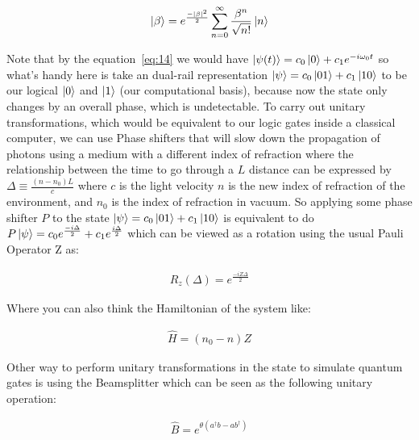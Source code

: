 \documentclass[
  journal=largetwo,
  year=2023,
]{cup-journal}
\begin{document}
\begin{equation}
  \begin{aligned}\label{eq:15}
    \ket{\beta} = e^{\frac{-|\beta|^2}{2}}\sum_{n=0}^{\infty}{\frac{\beta^n}{\sqrt{n!}}\ket{n}}
  \end{aligned}
\end{equation}


Note that by the equation~\ref{eq:14} we would have \(\ket{\psi(t)} = c_0\ket{0} + c_1e^{-i\omega_0t}\) so what's handy here is take an dual-rail representation \(\ket{\psi} = c_0\ket{01} + c_1\ket{10}\) to be our logical \(\ket{0}\) and \(\ket{1}\) (our computational basis), because now the state only changes by an overall phase, which is undetectable. To carry out unitary transformations, which would be equivalent to our logic gates inside a classical computer, we can use Phase shifters that will slow down the propagation of photons using a medium with a different index of refraction where the relationship between the time to go through a \(L\) distance can be expressed by \(\Delta \equiv \frac{(n - n_0)L}{c}\) where \(c\) is the light velocity \(n\) is the new index of refraction of the environment, and \(n_0\) is the index of refraction in vacuum. So applying some phase shifter \(P\) to the state \(\ket{\psi} = c_0\ket{01} + c_1\ket{10}\) is equivalent to do \(P\ket{\psi} = c_0e^{\frac{-i\Delta}{2}} + c_1e^{\frac{i\Delta}{2}}\) which can be viewed as a rotation using the usual Pauli Operator Z as:

\begin{equation}
  \begin{aligned}\label{eq:15}
    R_z(\Delta) = e^{\frac{-iZ\Delta}{2}}
  \end{aligned}
\end{equation}


Where you can also think the Hamiltonian of the system like:

\begin{equation}
  \begin{aligned}\label{eq:15}
    \hat{H} = (n_0 - n)Z
  \end{aligned}
\end{equation}


Other way to perform unitary transformations in the state to simulate quantum gates is using the Beamsplitter which can be seen as the following unitary operation:

\begin{equation}
  \begin{aligned}\label{eq:15}
    \hat{B} = e^{\theta(a^{\dag}b - ab^\dag)}
  \end{aligned}
\end{equation}
\end{document}
